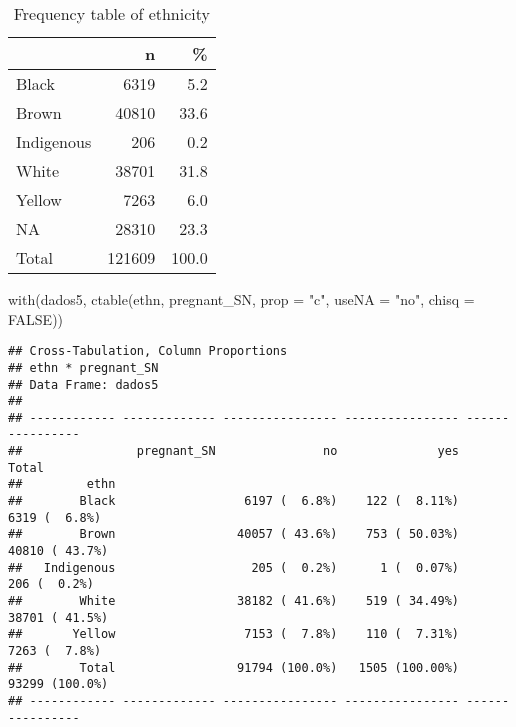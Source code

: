 \documentclass[
]{article}
\newenvironment{Shaded}{\begin{snugshade}}{\end{snugshade}}
\newcommand{\AttributeTok}[1]{\textcolor[rgb]{0.77,0.63,0.00}{#1}}
\newcommand{\CommentTok}[1]{\textcolor[rgb]{0.56,0.35,0.01}{\textit{#1}}}
\newcommand{\ConstantTok}[1]{\textcolor[rgb]{0.00,0.00,0.00}{#1}}
\newcommand{\FunctionTok}[1]{\textcolor[rgb]{0.00,0.00,0.00}{#1}}
\newcommand{\NormalTok}[1]{#1}
\newcommand{\SpecialCharTok}[1]{\textcolor[rgb]{0.00,0.00,0.00}{#1}}
\newcommand{\StringTok}[1]{\textcolor[rgb]{0.31,0.60,0.02}{#1}}
\begin{document}
\begin{table}[H]

\caption{\label{tab:unnamed-chunk-27}Frequency table of ethnicity}
\centering
\begin{tabular}[t]{l|r|r}
\hline
  & n & \%\\
\hline
Black & 6319 & 5.2\\
\hline
Brown & 40810 & 33.6\\
\hline
Indigenous & 206 & 0.2\\
\hline
White & 38701 & 31.8\\
\hline
Yellow & 7263 & 6.0\\
\hline
NA & 28310 & 23.3\\
\hline
Total & 121609 & 100.0\\
\hline
\end{tabular}
\end{table}

\begin{Shaded}
\begin{Highlighting}[]
\FunctionTok{with}\NormalTok{(dados5, }\FunctionTok{ctable}\NormalTok{(ethn, pregnant\_SN, }\AttributeTok{prop =} \StringTok{"c"}\NormalTok{, }\AttributeTok{useNA =} \StringTok{"no"}\NormalTok{, }\AttributeTok{chisq =} \ConstantTok{FALSE}\NormalTok{))}
\end{Highlighting}
\end{Shaded}

\begin{verbatim}
## Cross-Tabulation, Column Proportions  
## ethn * pregnant_SN  
## Data Frame: dados5  
## 
## ------------ ------------- ---------------- ---------------- ----------------
##                pregnant_SN               no              yes            Total
##         ethn                                                                 
##        Black                  6197 (  6.8%)    122 (  8.11%)    6319 (  6.8%)
##        Brown                 40057 ( 43.6%)    753 ( 50.03%)   40810 ( 43.7%)
##   Indigenous                   205 (  0.2%)      1 (  0.07%)     206 (  0.2%)
##        White                 38182 ( 41.6%)    519 ( 34.49%)   38701 ( 41.5%)
##       Yellow                  7153 (  7.8%)    110 (  7.31%)    7263 (  7.8%)
##        Total                 91794 (100.0%)   1505 (100.00%)   93299 (100.0%)
## ------------ ------------- ---------------- ---------------- ----------------
\end{verbatim}

\begin{Shaded}
\end{Shaded}
\end{document}
